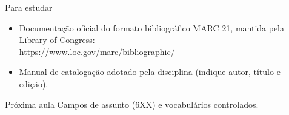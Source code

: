 \documentclass[11pt]{beamer}
\newif\ifinstrucoes
\newcommand{\instrucao}[1]{\ifinstrucoes\par\vfill{\color{gray}\scriptsize\itshape #1\par}\fi}
\begin{document}
\begin{frame}{Para estudar}
  \begin{itemize}
    \item Documentação oficial do formato bibliográfico MARC 21, mantida pela Library of Congress:\\
      \url{https://www.loc.gov/marc/bibliographic/}
    \item Manual de catalogação adotado pela disciplina (indique autor, título e edição).
  \end{itemize}
  \bigskip
  \begin{block}{Próxima aula}
    Campos de assunto (6XX) e vocabulários controlados.
  \end{block}
  \instrucao{Indique onde o aluno encontra a norma completa e anuncie o tema da próxima aula.}
\end{frame}
\end{document}
